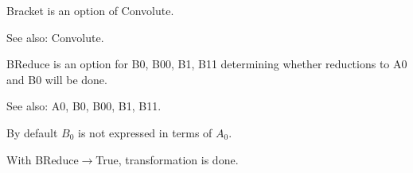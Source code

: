 


Bracket is an option of Convolute.

See also:  Convolute.



BReduce is an option for B0, B00, B1, B11 determining whether reductions to A0 and B0 will be done. 

See also:  A0, B0, B00, B1, B11.


By default \({B_0}\) is not expressed in terms of \({A_0}\).





With BReduce\(\rightarrow \)True, transformation is done.




